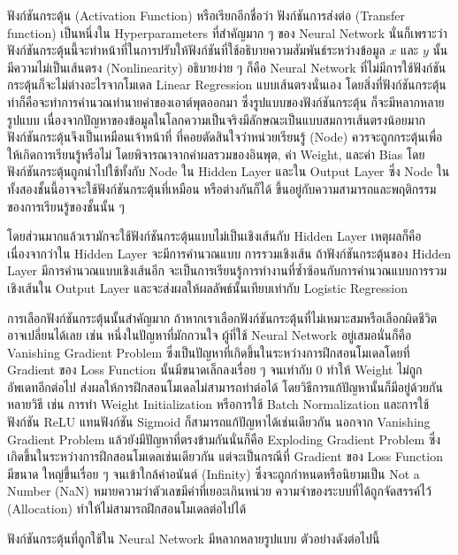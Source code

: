 ฟังก์ชันกระตุ้น (Activation Function) หรือเรียกอีกชื่อว่า ฟังก์ชันการส่งต่อ (Transfer function) เป็นหนึ่งใน Hyperparameters 
ที่สำคัญมาก ๆ ของ Neural Network นั่นก็เพราะว่าฟังก์ชันกระตุ้นนี้จะทำหน้าที่ในการปรับให้ฟังก์ชันที่ใช้อธิบายความสัมพันธ์ระหว่างข้อมูล $x$ 
และ $y$ นั้นมีความไม่เป็นเส้นตรง (Nonlinearity) อธิบายง่าย ๆ ก็คือ Neural Network ที่ไม่มีการใช้ฟังก์ชันกระตุ้นก็จะไม่ต่างอะไรจากโมเดล
Linear Regression แบบเส้นตรงนั่นเอง โดยสิ่งที่ฟังก์ชันกระตุ้นทำก็คือจะทำการคำนวณทำนายค่าของเอาต์พุตออกมา ซึ่งรูปแบบของฟังก์ชันกระตุ้น%
ก็จะมีหลากหลายรูปแบบ เนื่องจากปัญหาของข้อมูลในโลกความเป็นจริงมีลักษณะเป็นแบบสมการเส้นตรงน้อยมาก ฟังก์ชันกระตุ้นจึงเป็นเหมือนเจ้าหน้าที่%
ที่คอยตัดสินใจว่าหน่วยเรียนรู้ (Node) ควรจะถูกกระตุ้นเพื่อให้เกิดการเรียนรู้หรือไม่ โดยพิจารณาจากค่าผลรวมของอินพุต, ค่า Weight, และค่า Bias 
โดยฟังก์ชันกระตุ้นถูกนำไปใช้ทั้งกับ Node ใน Hidden Layer และใน Output Layer ซึ่ง Node ในทั้งสองชั้นนี้อาจจะใช้ฟังก์ชันกระตุ้นที่เหมือน%
หรือต่างกันก็ได้ ขึ้นอยู่กับความสามารถและพฤติกรรมของการเรียนรู้ของชั้นนั้น ๆ 

โดยส่วนมากแล้วเรามักจะใช้ฟังก์ชันกระตุ้นแบบไม่เป็นเชิงเส้นกับ Hidden Layer เหตุผลก็คือเนื่องจากว่าใน Hidden Layer จะมีการคำนวณแบบ%
การรวมเชิงเส้น ถ้าฟังก์ชันกระตุ้นของ Hidden Layer มีการคำนวณแบบเชิงเส้นอีก จะเป็นการเรียนรู้การทำงานที่ซ้ำซ้อนกับการคำนวณแบบการรวม%
เชิงเส้นใน Output Layer และจะส่งผลให้ผลลัพธ์นั้นเทียบเท่ากับ Logistic Regression 

การเลือกฟังก์ชันกระตุ้นนั้นสำคัญมาก ถ้าหากเราเลือกฟังก์ชันกระตุ้นที่ไม่เหมาะสมหรือเลือกผิดชีวิตอาจเปลี่ยนได้เลย เช่น หนึ่งในปัญหาที่มักกวนใจ%
ผู้ที่ใช้ Neural Network อยู่เสมอนั่นก็คือ Vanishing Gradient Problem ซึ่งเป็นปัญหาที่เกิดขึ้นในระหว่างการฝึกสอนโมเดลโดยที่ Gradient 
ของ Loss Function นั้นมีขนาดเล็กลงเรื่อย ๆ จนเท่ากับ 0 ทำให้ Weight ไม่ถูกอัพเดทอีกต่อไป ส่งผลให้การฝึกสอนโมเดลไม่สามารถทำต่อได้
โดยวิธีการแก้ปัญหานั้นก็มีอยู่ด้วยกันหลายวิธี เช่น การทำ Weight Initialization หรือการใช้ Batch Normalization และการใช้ฟังก์ชัน 
ReLU แทนฟังก์ชัน Sigmoid ก็สามารถแก้ปัญหาได้เช่นเดียวกัน นอกจาก Vanishing Gradient Problem แล้วยังมีปัญหาที่ตรงข้ามกันนั่นก็คือ 
Exploding Gradient Problem ซึ่งเกิดขึ้นในระหว่างการฝึกสอนโมเดลเช่นเดียวกัน แต่จะเป็นกรณีที่ Gradient ของ Loss Function มีขนาด%
ใหญ่ขึ้นเรื่อย ๆ จนเข้าใกล้ค่าอนันต์ (Infinity) ซึ่งจะถูกกำหนดหรือนิยามเป็น Not a Number (NaN) หมายความว่าตัวเลขมีค่าที่เยอะเกินหน่วย%
ความจำของระบบที่ได้ถูกจัดสรรค์ไว้ (Allocation) ทำให้ไม่สามารถฝึกสอนโมเดลต่อไปได้

ฟังก์ชันกระตุ้นที่ถูกใช้ใน Neural Network มีหลากหลายรูปแบบ ตัวอย่างดังต่อไปนี้

